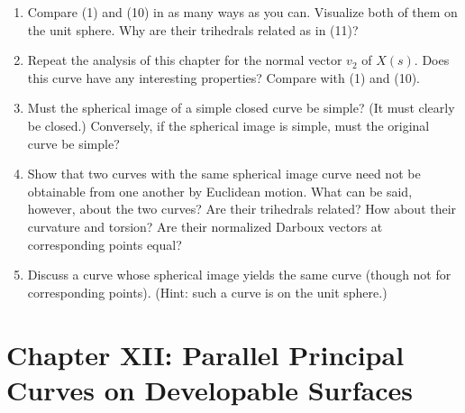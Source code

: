 \documentclass{book}
\begin{document}
\begin{enumerate}
    \begin{equation}
      Y(s) = v_{3}(s)
    \end{equation}
    and give it the same analysis as we gave the spherical image curve (1). Show that if the moving trihedral of (10) is denoted $u_{i}$ while that of the spherical image (1) is denoted by $w_{i}$, then
    \begin{align}
      u_{1} & = - w_{1} \notag \\
      u_{2} & = - w_{2} \\
      u_{3} & = w_{3} \notag
    \end{align}
    What is the ratio of the arclength element of (10) to the original curve $X(s)$? Find the curvature and torsion of (10), and make various inferences from them. What can be said about $X(s)$ if (10) is a single point? Show that if $X(s)$ is a helix, then the curve (10) has constant curvature.
  \item Compare (1) and (10) in as many ways as you can. Visualize both of them on the unit sphere. Why are their trihedrals related as in (11)?
  \item Repeat the analysis of this chapter for the normal vector $v_{2}$ of $X(s)$. Does this curve have any interesting properties? Compare with (1) and (10).
  \item Must the spherical image of a simple closed curve be simple? (It must clearly be closed.) Conversely, if the spherical image is simple, must the original curve be simple?
  \item Show that two curves with the same spherical image curve need not be obtainable from one another by Euclidean motion. What can be said, however, about the two curves? Are their trihedrals related? How about their curvature and torsion? Are their normalized Darboux vectors at corresponding points equal?
  \item Discuss a curve whose spherical image yields the same curve (though not for corresponding points). (Hint: such a curve is on the unit sphere.)
\end{enumerate}



\chapter*{Chapter XII: Parallel Principal Curves on Developable Surfaces}
\end{document}
